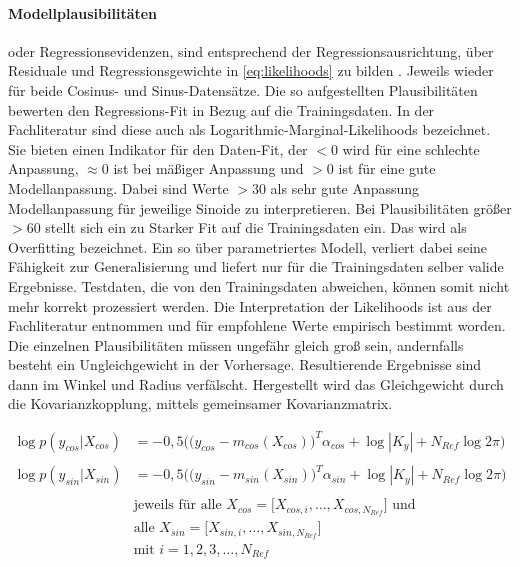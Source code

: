 \paragraph*{Modellplausibilitäten} oder Regressionsevidenzen, sind entsprechend der Regressionsausrichtung, über Residuale und Regressionsgewichte in \autoref{eq:likelihoods} zu bilden \cite{Rasmussen2006}. Jeweils wieder für beide Cosinus- und Sinus-Datensätze. Die so aufgestellten Plausibilitäten bewerten den Regressions-Fit in Bezug auf die Trainingsdaten. In der Fachliteratur \cite{Rasmussen2006} sind diese auch als Logarithmic-Marginal-Likelihoods bezeichnet. Sie bieten einen Indikator für den Daten-Fit, der $< 0$ wird für eine schlechte Anpassung, $\approx 0$ ist bei mäßiger Anpassung und $> 0$ ist für eine gute Modellanpassung. Dabei sind Werte $> 30$ als sehr gute Anpassung Modellanpassung für jeweilige Sinoide zu interpretieren. Bei Plausibilitäten größer $> 60$ stellt sich ein zu Starker Fit auf die Trainingsdaten ein. Das wird als Overfitting bezeichnet. Ein so über parametriertes Modell, verliert dabei seine Fähigkeit zur Generalisierung und liefert nur für die Trainingsdaten selber valide Ergebnisse. Testdaten, die von den Trainingsdaten abweichen, können somit nicht mehr korrekt prozessiert werden. Die Interpretation der Likelihoods ist aus der Fachliteratur \cite{Rasmussen2006} entnommen und für empfohlene Werte empirisch bestimmt worden. Die einzelnen Plausibilitäten müssen ungefähr gleich groß sein, andernfalls besteht ein Ungleichgewicht in der Vorhersage. Resultierende Ergebnisse sind dann im Winkel und Radius verfälscht. Hergestellt wird das Gleichgewicht durch die Kovarianzkopplung, mittels gemeinsamer Kovarianzmatrix.


\begin{align}\label{eq:likelihoods}
	\log p(y_{cos}|X_{cos}) &= -0,5 \Big( \big( y_{cos} - m_{cos}(X_{cos}) \big)^T \alpha_{cos} + \log|K_y| + N_{Ref} \log 2\pi  \Big) \nonumber \\
	\\
	\log p(y_{sin}|X_{sin}) &= -0,5 \Big( \big( y_{sin} - m_{sin}(X_{sin}) \big)^T \alpha_{sin} + \log|K_y| + N_{Ref} \log 2\pi  \Big) \nonumber \\
	\nonumber \\
& \text{jeweils für alle } X_{cos} = \big[ X_{cos,i},\dots, X_{cos,N_{Ref}} \big] \text{ und } \nonumber \\
& \text{alle } X_{sin} = \big[ X_{sin,i},\dots, X_{sin,N_{Ref}} \big] \nonumber \\
& \text{mit } i = 1,2,3,\ldots,N_{Ref} \nonumber	
\end{align}


